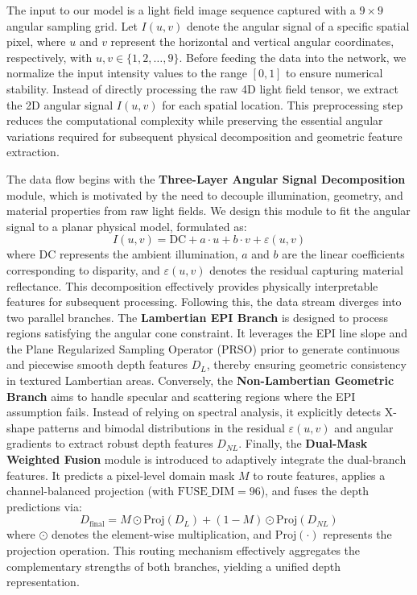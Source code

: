 \documentclass[lettersize,journal]{IEEEtran}
\begin{document}
The input to our model is a light field image sequence captured with a $9 \times 9$ angular sampling grid. Let $I(u,v)$ denote the angular signal of a specific spatial pixel, where $u$ and $v$ represent the horizontal and vertical angular coordinates, respectively, with $u, v \in \{1, 2, \dots, 9\}$. Before feeding the data into the network, we normalize the input intensity values to the range $[0, 1]$ to ensure numerical stability. Instead of directly processing the raw 4D light field tensor, we extract the 2D angular signal $I(u,v)$ for each spatial location. This preprocessing step reduces the computational complexity while preserving the essential angular variations required for subsequent physical decomposition and geometric feature extraction.

The data flow begins with the \textbf{Three-Layer Angular Signal Decomposition} module, which is motivated by the need to decouple illumination, geometry, and material properties from raw light fields. We design this module to fit the angular signal to a planar physical model, formulated as:
\begin{equation}
I(u,v) = \text{DC} + a \cdot u + b \cdot v + \varepsilon(u,v)
\label{eq:ch3_1}
\end{equation}
where $\text{DC}$ represents the ambient illumination, $a$ and $b$ are the linear coefficients corresponding to disparity, and $\varepsilon(u,v)$ denotes the residual capturing material reflectance. This decomposition effectively provides physically interpretable features for subsequent processing. Following this, the data stream diverges into two parallel branches. The \textbf{Lambertian EPI Branch} is designed to process regions satisfying the angular cone constraint. It leverages the EPI line slope and the Plane Regularized Sampling Operator (PRSO) prior to generate continuous and piecewise smooth depth features $D_L$, thereby ensuring geometric consistency in textured Lambertian areas. Conversely, the \textbf{Non-Lambertian Geometric Branch} aims to handle specular and scattering regions where the EPI assumption fails. Instead of relying on spectral analysis, it explicitly detects X-shape patterns and bimodal distributions in the residual $\varepsilon(u,v)$ and angular gradients to extract robust depth features $D_{NL}$. Finally, the \textbf{Dual-Mask Weighted Fusion} module is introduced to adaptively integrate the dual-branch features. It predicts a pixel-level domain mask $M$ to route features, applies a channel-balanced projection (with $\text{FUSE\_DIM}=96$), and fuses the depth predictions via:
\begin{equation}
D_{\text{final}} = M \odot \text{Proj}(D_L) + (1 - M) \odot \text{Proj}(D_{NL})
\label{eq:ch3_2}
\end{equation}
where $\odot$ denotes the element-wise multiplication, and $\text{Proj}(\cdot)$ represents the projection operation. This routing mechanism effectively aggregates the complementary strengths of both branches, yielding a unified depth representation.
\end{document}
